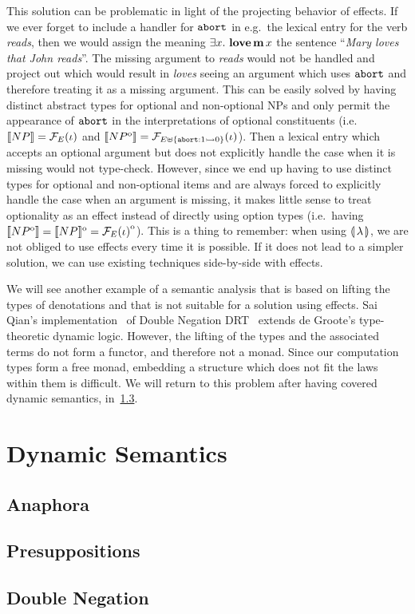 This solution can be problematic in light of the projecting behavior of
effects. If we ever forget to include a handler for $\mathtt{abort}$ in e.g.\
the lexical entry for the verb \emph{reads}, then we would assign the
meaning $\exists x.\ \textbf{love}\,\textbf{m}\,x$ the sentence
``\emph{Mary loves that John reads}''. The missing argument to \emph{reads}
would not be handled and project out which would result in \emph{loves}
seeing an argument which uses $\mathtt{abort}$ and therefore treating it as a
missing argument. This can be easily solved by having distinct abstract
types for optional and non-optional NPs and only permit the appearance of
$\mathtt{abort}$ in the interpretations of optional constituents (i.e.\
$\llbracket NP \rrbracket = \mathcal{F}_E(\iota)$ and
$\llbracket NP^{\mathrm{o}} \rrbracket = \mathcal{F}_{E \uplus \{\mathtt{abort} : 1 \rightarrowtail 0\}}(\iota)$). Then
a lexical entry which accepts an optional argument but does not explicitly
handle the case when it is missing would not type-check. However, since we
end up having to use distinct types for optional and non-optional items and
are always forced to explicitly handle the case when an argument is
missing, it makes little sense to treat optionality as an effect instead of
directly using option types (i.e.\ having
$\llbracket NP^{\mathrm{o}} \rrbracket = \llbracket NP \rrbracket^{\mathrm{o}} = {\mathcal{F}_E(\iota)}^{\mathrm{o}}$). This is a
thing to remember: when using $\llparenthesis \, \lambda \, \rrparenthesis$, we are not obliged to use
effects every time it is possible. If it does not lead to a simpler
solution, we can use existing techniques side-by-side with effects.

We will see another example of a semantic analysis that is based on lifting
the types of denotations and that is not suitable for a solution using
effects. Sai Qian's implementation~\cite{qian2014accessibility} of Double
Negation DRT~\cite{krahmer1995negation} extends de Groote's type-theoretic
dynamic logic. However, the lifting of the types and the associated terms
do not form a functor, and therefore not a monad. Since our computation
types form a free monad, embedding a structure which does not fit the laws
within them is difficult. We will return to this problem after having
covered dynamic semantics, in~\ref{ssec:double-negation}.


\section{Dynamic Semantics}
\label{sec:dynamic-semantics}


\subsection{Anaphora}


\subsection{Presuppositions}


\subsection{Double Negation}
\label{ssec:double-negation}

